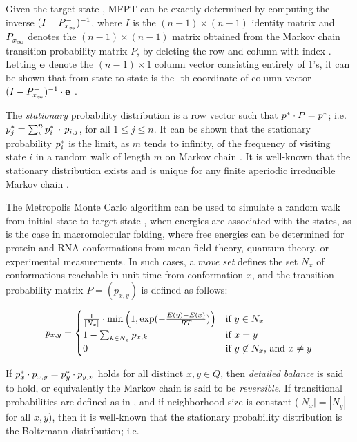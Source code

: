 Given the target state \xEnd, MFPT can be exactly
determined by computing the inverse
$(I - P^{-}_{x_\infty})^{-1}$, where $I$ is the $(n-1)\times (n-1)$ identity
matrix and $P^{-}_{x_\infty}$
denotes the $(n-1)\times (n-1)$ matrix obtained from the
Markov chain transition probability matrix $P$,
by deleting the row and column with index \xEnd.
Letting ${\bf e}$ denote the
$(n-1) \times 1$ column vector consisting entirely of 1's, it can be
shown that \mfpt from state \xStart to state \xEnd
is the \xStart-th coordinate
of column vector
$(I - P^{-}_{x_\infty})^{-1} \cdot {\bf e}$ \citep{meyermfpt}.

The {\em stationary} probability distribution \statDist
is a row vector such that $p^* \cdot P = p^*$; i.e.
$p^*_j = \sum_{i}^n p^*_i\, \cdot\, p_{i,j}$, for all $1\leq j \leq n$.
It can be shown that the stationary probability $p^*_i$ is the limit,
as $m$ tends to infinity, of the frequency of visiting state $i$ in a
random walk of length $m$ on Markov chain \mChain.
It is well-known that the stationary distribution exists and is unique
for any finite aperiodic irreducible Markov chain \citep{cloteBackofen:book}.

The Metropolis Monte Carlo algorithm \citep{metropolis:MonteCarlo} can
be used to simulate a random walk from initial state \xStart to target state
\xEnd, when energies are associated with the states, as is the case in
macromolecular folding, where free energies can be determined for
protein and RNA conformations from mean field theory, quantum theory,
or experimental measurements. In such cases, a {\em move set}
defines the set $N_x$ of conformations reachable in unit time
from conformation $x$, and the transition probability matrix
$P = (p_{x,y})$ is defined as follows:

\begin{align}
\label{eq:hermes:mfptXitionProb}
p_{x,y} =
\begin{cases}
\frac{1}{|N_x|} \cdot \min\left( 1, \boltzYmX \right)
& \text{if $y \in N_x$} \\
1 - \sum_{k \in N_x} p_{x,k} & \text{if $x=y$} \\
0 & \text{if $y \not\in N_x$, and $x \ne y$} \\
\end{cases}
\end{align}

If $p^*_x \cdot p_{x,y} = p^*_y \cdot p_{y,x}$ holds for all distinct
$x,y \in Q$, then
{\em detailed balance} is said to hold, or equivalently the Markov
chain \mChain is said to be {\em reversible}.
If transitional probabilities
are defined as in , and if neighborhood
size is constant ($|N_x|=|N_y|$ for all $x,y$), then it is well-known
that the stationary probability distribution
\statDist is the Boltzmann distribution; i.e.

